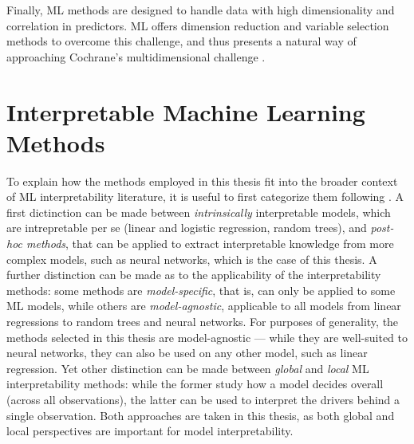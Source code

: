 			Finally, ML methods are designed to handle data with high dimensionality and correlation in predictors. ML offers dimension reduction and variable selection methods to overcome this challenge, and thus presents a natural way of approaching Cochrane's multidimensional challenge \citep{cochrane2011presidential}. 	
			
	
	\section{Interpretable Machine Learning Methods}
	
		To explain how the methods employed in this thesis fit into the broader context of ML interpretability literature, it is useful to first categorize them following \cite{molnar2020interpretable}. A first dictinction can be made between \textit{intrinsically} interpretable models, which are intrepretable per se (linear and logistic regression, random trees), and \textit{post-hoc methods}, that can be applied to extract interpretable knowledge from more complex models, such as neural networks, which is the case of this thesis. A further distinction can be made as to the applicability of the interpretability methods: some methods are \textit{model-specific}, that is, can only be applied to some ML models, while others are \textit{model-agnostic}, applicable to all models from linear regressions to random trees and neural networks. For purposes of generality, the methods selected in this thesis are model-agnostic --- while they are well-suited to neural networks, they can also be used on any other model, such as linear regression. Yet other distinction can be made between \textit{global} and \textit{local} ML interpretability methods: while the former study how a model decides overall (across all observations), the latter can be used to interpret the drivers behind a single observation. Both approaches are taken in this thesis, as both global and local perspectives are important for model interpretability.
			
			
